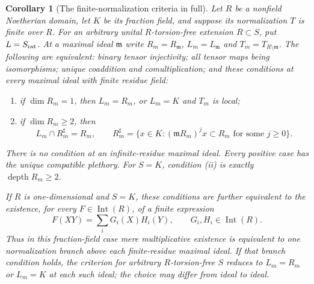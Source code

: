 \documentclass[11pt,a4paper]{article}
\newtheorem{corollary}[theorem]{Corollary}
\theoremstyle{definition}
\begin{document}
\begin{corollary}[The finite-normalization criteria in full]\label{result-50}
Let $R$ be a nonfield Noetherian domain, let $K$ be its fraction field,
and suppose its normalization $T$ is finite over $R$. For an arbitrary
unital $R$-torsion-free extension $R\subset S$, put $L=S_{\rm rat}$.
At a maximal ideal $\mathfrak m$ write $R_m=R_{\mathfrak m}$,
$L_m=L_{\mathfrak m}$ and $T_m=T_{R\setminus\mathfrak m}$.
The following are equivalent: binary tensor injectivity; all tensor
maps being isomorphisms; unique coaddition and comultiplication; and
these conditions at every maximal ideal with finite residue field:
\begin{enumerate}[label=(\roman*)]
\item if $\dim R_m=1$, then $L_m=R_m$, or $L_m=K$ and $T_m$ is local;
\item if $\dim R_m\ge2$, then
\[
 L_m\cap R_m^\sharp=R_m,\qquad
 R_m^\sharp=\{x\in K:(\mathfrak mR_m)^j x\subset R_m
                              \text{ for some }j\ge0\}.
\]
\end{enumerate}
There is no condition at an infinite-residue maximal ideal. Every
positive case has the unique compatible plethory. For $S=K$, condition
(ii) is exactly $\operatorname{depth}R_m\ge2$.

If $R$ is one-dimensional and $S=K$, these conditions are further
equivalent to the existence, for every $F\in\operatorname{Int}(R)$,
of a finite expression
\[
                    F(XY)=\sum_i G_i(X)H_i(Y),
       \qquad G_i,H_i\in\operatorname{Int}(R).
\]
Thus in this fraction-field case mere multiplicative existence is
equivalent to one normalization branch above each finite-residue maximal
ideal. If that branch condition holds, the criterion for arbitrary
$R$-torsion-free $S$ reduces to $L_m=R_m$ or $L_m=K$ at each such
ideal; the choice may differ from ideal to ideal.
\end{corollary}
\end{document}
